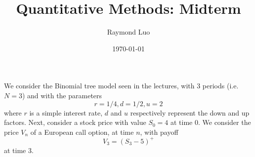 \documentclass[12pt,twoside, letter]{exam}
\theoremstyle{definition}
\begin{document}
\abovedisplayskip=12pt
\belowdisplayskip=12pt
\abovedisplayshortskip=7pt
\belowdisplayshortskip=10pt
\allowdisplaybreaks

\setlength{\parindent}{18pt}

\title{Quantitative Methods: Midterm}
\author{Raymond Luo}
\date{\today}
\maketitle

 We consider the Binomial tree model seen in the lectures, with 3 periods
(i.e. $N=3$) and with the parameters
\begin{equation*}
  r = 1/4, d = 1/2, u = 2
\end{equation*}
where $r$ is a simple interest rate, $d$ and $u$ respectively represent the down and up factors. Next, consider a stock price
with value $S_0 = 4$ at time $0$. We consider the price $V_n$ of a European call option, at time $n$, with payoff
\begin{equation*}
  V_3 = (S_3-5)^+
\end{equation*}
at time 3.
\end{document}
